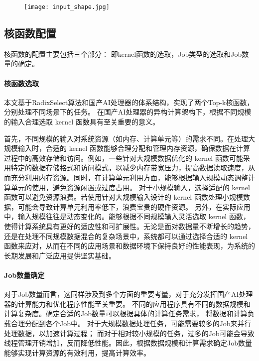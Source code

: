     \begin{figure}[ht]
        \centering
        \texttt{[image: input\_shape.jpg]}
        \caption{}
        \label{fig:input_shape}
    \end{figure}
    
    
    \subsection{核函数配置}
    核函数的配置主要包括三个部分：
    即kernel函数的选取，Job类型的选取和Job数量的确定。
        \paragraph{核函数选取}
        本文基于RadixSelect算法和国产AI处理器的体系结构，实现了两个Top-k核函数，分别处理不同场景下的任务。
        在国产AI处理器的异构计算架构下，根据不同规模的输入合理选取 kernel 函数具有至关重要的意义。

        首先，不同规模的输入对系统资源（如内存、计算单元等）的需求不同。在处理大规模输入时，合适的 kernel 函数能够合理分配和管理内存资源，确保数据在计算过程中的高效存储和访问。例如，一些针对大规模数据优化的 kernel 函数可能采用特定的数据存储格式和访问模式，以减少内存带宽压力，提高数据读取速度，从而充分利用内存资源。同时，在计算单元利用方面，能够根据输入规模动态调整计算单元的使用，避免资源闲置或过度占用。
        对于小规模输入，选择适配的 kernel 函数可以避免资源浪费。若使用针对大规模输入设计的 kernel 函数处理小规模数据，可能会导致计算单元利用率低下，浪费宝贵的硬件资源。
        另外，在实际应用中，输入规模往往是动态变化的。能够根据不同规模输入灵活选取 kernel 函数，使得计算系统具有更好的适应性和可扩展性。无论是面对数据量不断增长的趋势，还是在处理不同规模数据混合的复杂场景中，系统都可以通过选择合适的 kernel 函数来应对，从而在不同的应用场景和数据环境下保持良好的性能表现，为系统的长期发展和广泛应用提供坚实基础。




        
        
        \paragraph{Job数量确定}
        对于Job数量而言，这同样涉及到多个方面的重要考量，对于充分发挥国产AI处理器的计算能力和优化程序性能至关重要。
        不同的应用程序具有不同的数据规模和计算复杂度。确定合适的Job数量可以根据具体的计算任务需求，
        将数据和计算负载合理分配到各个Job中。
        对于大规模数据处理任务，可能需要较多的Job来并行处理数据，以加速计算过程；
        而对于相对较小规模的任务，过多的Job可能会导致线程管理开销增加，反而降低性能。因此，根据数据规模和计算需求确定Job数量能够实现计算资源的有效利用，提高计算效率。


